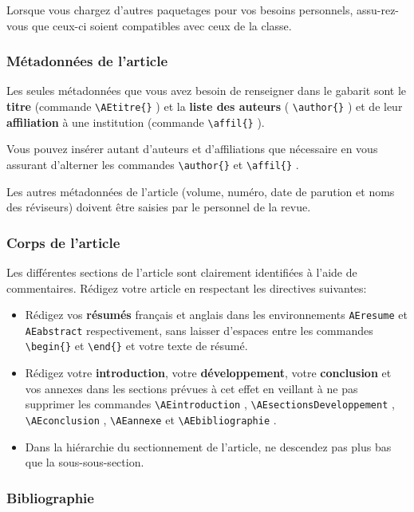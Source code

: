 \documentclass[french]{article}
\newcommand{\cmd}[1]{%
	\texttt{\textbackslash#1\{\}}
}
\newcommand{\dec}[1]{%
	\texttt{\textbackslash#1}
}
\begin{document}
				Lorsque vous chargez d'autres paquetages pour vos besoins personnels, assu-rez-vous que ceux-ci soient
				compatibles avec ceux de la classe.
				
			\subsubsection{Métadonnées de l'article}
			
				Les seules métadonnées que vous avez besoin de renseigner dans le gabarit sont le \textbf{titre} (commande
				\cmd{AEtitre}) et la \textbf{liste des auteurs} (\cmd{author}) et de leur \textbf{affiliation} à une institution (commande
				\cmd{affil}).
				
				Vous pouvez insérer autant d'auteurs et d'affiliations que nécessaire en vous assurant d'alterner les
				commandes \cmd{author} et \cmd{affil}.
				
				Les autres métadonnées de l'article (volume, numéro, date de parution et noms des réviseurs) doivent
				être saisies par le personnel de la revue.
				
			\subsubsection{Corps de l'article}
			
				Les différentes sections de l'article sont clairement identifiées à l'aide de commentaires. Rédigez
				votre article en respectant les directives suivantes:
				
				\begin{itemize}
					\item Rédigez vos \textbf{résumés}  français et anglais dans les environnements \texttt{AEresume} et
						\texttt{AEabstract} respectivement, sans laisser d'espaces entre les commandes \cmd{begin} et 
						\cmd{end} et votre texte de résumé.
					\item Rédigez votre \textbf{introduction}, votre \textbf{développement}, votre \textbf{conclusion} 
						et vos annexes dans les sections prévues
						à cet effet en veillant à ne pas supprimer les commandes \dec{AEintroduction},
						\dec{AEsectionsDeveloppement}, \dec{AEconclusion}, \dec{AEannexe} et \dec{AEbibliographie}.
					\item Dans la hiérarchie du sectionnement de l'article, ne descendez pas plus bas que la sous-sous-section.
				\end{itemize}
			
			\subsubsection{Bibliographie}
			
\end{document}
